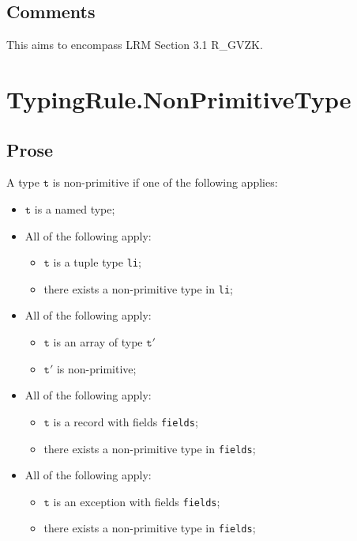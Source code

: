 \documentclass{book}
\newcommand\vt[0]{\texttt{t}}
\begin{document}
    \subsection{Comments}
    This aims to encompass LRM Section 3.1 R\_GVZK.

\newcommand\vtp[0]{\texttt{t}'}

\section{TypingRule.NonPrimitiveType}

    \subsection{Prose} 
    A type $\vt$ is non-primitive if one of the following applies:
    \begin{itemize}
    \item $\vt$ is a named type;
    \item All of the following apply:
      \begin{itemize}
      \item $\vt$ is a tuple type \texttt{li};
      \item there exists a non-primitive type in \texttt{li};
      \end{itemize}
    \item All of the following apply:
      \begin{itemize}
      \item $\vt$ is an array of type $\vtp$
      \item $\vtp$ is non-primitive; 
      \end{itemize}
    \item All of the following apply:
      \begin{itemize}
      \item $\vt$ is a record with fields \texttt{fields};
      \item there exists a non-primitive type in \texttt{fields};
      \end{itemize}
    \item All of the following apply:
      \begin{itemize}
      \item $\vt$ is an exception with fields \texttt{fields};
      \item there exists a non-primitive type in \texttt{fields};
      \end{itemize}
    \end{itemize}
\end{document}
